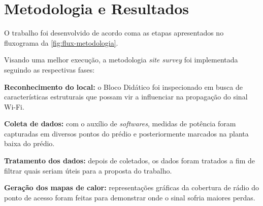 \chapter{Metodologia e Resultados}
\label{cap:metodologia-e-resultados}

O trabalho foi desenvolvido de acordo coma as etapas apresentados no fluxograma da \autoref{fig:flux-metodologia}.

Visando uma melhor execução, a metodologia \textit{site survey} foi implementada seguindo as respectivas fases:
\begin{compactitem}
	\item \textbf{Reconhecimento do local:} o Bloco Didático foi inspecionado em busca de características estruturais que possam vir a influenciar na propagação do sinal Wi-Fi.
	
	\item \textbf{Coleta de dados:} com o auxílio de \textit{softwares}, medidas de potência foram capturadas em diversos pontos do prédio e posteriormente marcados na planta baixa do prédio.
	
	\item \textbf{Tratamento dos dados:} depois de coletados, os dados foram tratados a fim de filtrar quais seriam úteis para a proposta do trabalho.
	
	\item \textbf{Geração dos mapas de calor:} representações gráficas da cobertura de rádio do ponto de acesso foram feitas para demonstrar onde o sinal sofria maiores perdas.
\end{compactitem}

\begin{figure}[H]
	\centering
\end{figure}

